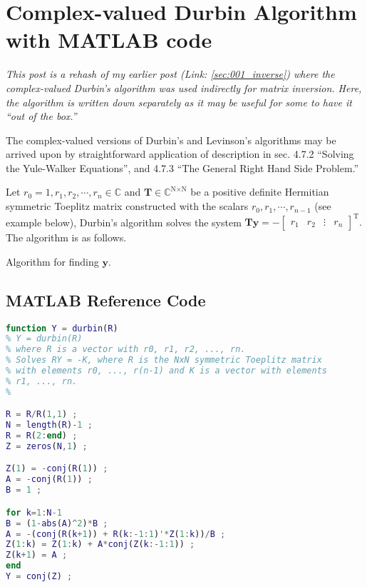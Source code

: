 \section{Complex-valued Durbin Algorithm with MATLAB code}

\emph{This post is a rehash of my earlier post (Link: \ref{sec:001_inverse}) where the complex-valued Durbin's algorithm was used indirectly for matrix inversion. Here, the algorithm is written down separately as it may be useful for some to have it ``out of the box.''}

The complex-valued versions of Durbin's and Levinson's algorithms may be arrived upon by straightforward application of description in \cite{Golub2012} sec. 4.7.2 ``Solving the Yule-Walker Equations'', and 4.7.3 ``The General Right Hand Side Problem.''

Let $r_0 = 1, r_1, r_2, \cdots, r_n \in \mathbb{C}$ and $\boldsymbol{T} \in \mathbb{C}^{\text{N}\times\text{N}}$ be a positive definite Hermitian symmetric Toeplitz matrix constructed with the scalars $r_0, r_1, \cdots, r_{n-1}$ (see example below), Durbin's algorithm solves the system $\boldsymbol{T} \boldsymbol{y} = - \begin{bmatrix}r_1 & r_2 & \vdots & r_n\end{bmatrix}^\mathrm{T}.$ The algorithm is as follows.

\begin{algorithm}[H]
\caption{Algorithm for finding $\boldsymbol{y}.$}
\begin{algorithmic}[1]
\EndFor
{}
\end{algorithmic}
\end{algorithm}

\subsection{MATLAB Reference Code}
\begin{lstlisting}[language=MATLAB,numbers=none]
function Y = durbin(R)
% Y = durbin(R)
% where R is a vector with r0, r1, r2, ..., rn.
% Solves RY = -K, where R is the NxN symmetric Toeplitz matrix 
% with elements r0, ..., r(n-1) and K is a vector with elements
% r1, ..., rn.
%

R = R/R(1,1) ;
N = length(R)-1 ;
R = R(2:end) ;
Z = zeros(N,1) ;

Z(1) = -conj(R(1)) ;
A = -conj(R(1)) ;
B = 1 ;

for k=1:N-1
B = (1-abs(A)^2)*B ;
A = -(conj(R(k+1)) + R(k:-1:1)'*Z(1:k))/B ;
Z(1:k) = Z(1:k) + A*conj(Z(k:-1:1)) ;
Z(k+1) = A ;
end
Y = conj(Z) ;
\end{lstlisting}

